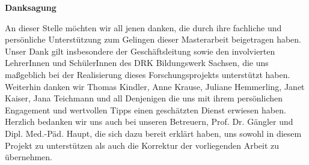\vspace*{\fill}
\begin{center}
\textbf{Danksagung}
\end{center}

\noindent 
An dieser Stelle möchten wir all jenen danken, die durch ihre fachliche und persönliche Unterstützung zum Gelingen dieser Masterarbeit beigetragen haben.\\[0,5cm]
Unser Dank gilt insbesondere der Geschäftsleitung sowie den involvierten LehrerInnen und SchülerInnen des DRK Bildungswerk Sachsen, die uns maßgeblich bei der Realisierung dieses Forschungsprojekts unterstützt haben.\\[0,5cm]
Weiterhin danken wir Thomas Kindler, Anne Krause, Juliane Hemmerling, Janet Kaiser, Jana Teichmann und all Denjenigen die uns mit ihrem persönlichen Engagement und wertvollen Tipps einen geschätzten Dienst erwiesen haben.\\[0,5cm]
Herzlich bedanken wir uns auch bei unseren Betreuern, Prof. Dr. Gängler und Dipl. Med.-Päd. Haupt, die sich dazu bereit erklärt haben, uns sowohl in diesem Projekt zu unterstützen als auch die Korrektur der vorliegenden Arbeit zu übernehmen.
\vspace{\fill}